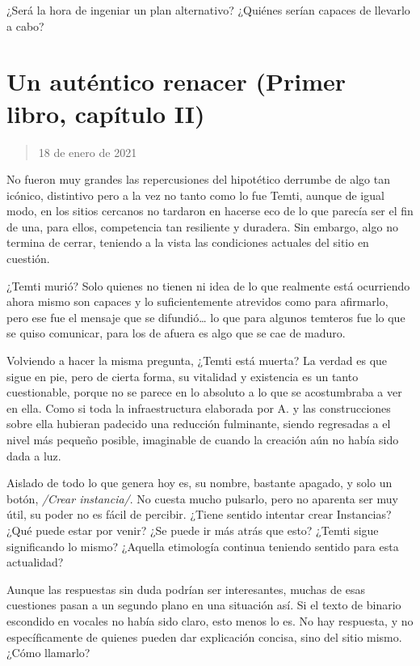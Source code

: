 \documentclass[
]{book}
\begin{document}
¿Será la hora de ingeniar un plan alternativo? ¿Quiénes serían capaces de llevarlo a cabo?

\hypertarget{un-autuxe9ntico-renacer-primer-libro-capuxedtulo-ii}{%
\section{Un auténtico renacer (Primer libro, capítulo II)}\label{un-autuxe9ntico-renacer-primer-libro-capuxedtulo-ii}}

\begin{quote}
18 de enero de 2021
\end{quote}

No fueron muy grandes las repercusiones del hipotético derrumbe de algo tan icónico, distintivo pero a la vez no tanto como lo fue Temti, aunque de igual modo, en los sitios cercanos no tardaron en hacerse eco de lo que parecía ser el fin de una, para ellos, competencia tan resiliente y duradera. Sin embargo, algo no termina de cerrar, teniendo a la vista las condiciones actuales del sitio en cuestión.

¿Temti murió? Solo quienes no tienen ni idea de lo que realmente está ocurriendo ahora mismo son capaces y lo suficientemente atrevidos como para afirmarlo, pero ese fue el mensaje que se difundió\ldots{} lo que para algunos temteros fue lo que se quiso comunicar, para los de afuera es algo que se cae de maduro.

Volviendo a hacer la misma pregunta, ¿Temti está muerta? La verdad es que sigue en pie, pero de cierta forma, su vitalidad y existencia es un tanto cuestionable, porque no se parece en lo absoluto a lo que se acostumbraba a ver en ella. Como si toda la infraestructura elaborada por A. y las construcciones sobre ella hubieran padecido una reducción fulminante, siendo regresadas a el nivel más pequeño posible, imaginable de cuando la creación aún no había sido dada a luz.

Aislado de todo lo que genera hoy es, su nombre, bastante apagado, y solo un botón, \emph{/Crear instancia/}. No cuesta mucho pulsarlo, pero no aparenta ser muy útil, su poder no es fácil de percibir. ¿Tiene sentido intentar crear Instancias? ¿Qué puede estar por venir? ¿Se puede ir más atrás que esto? ¿Temti sigue significando lo mismo? ¿Aquella etimología continua teniendo sentido para esta actualidad?

Aunque las respuestas sin duda podrían ser interesantes, muchas de esas cuestiones pasan a un segundo plano en una situación así. Si el texto de binario escondido en vocales no había sido claro, esto menos lo es. No hay respuesta, y no específicamente de quienes pueden dar explicación concisa, sino del sitio mismo. ¿Cómo llamarlo?
\end{document}
